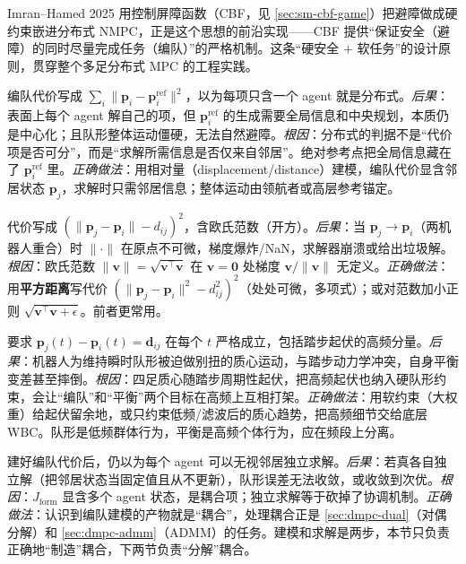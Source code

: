 \noindent Imran--Hamed 2025\cite{imran2025obstacle} 用控制屏障函数（CBF，见 \cref{sec:sm-cbf-game}）把避障做成硬约束嵌进分布式 NMPC，正是这个思想的前沿实现——CBF 提供“保证安全（避障）的同时尽量完成任务（编队）”的严格机制。这条“硬安全 $+$ 软任务”的设计原则，贯穿整个多足分布式 MPC 的工程实践。

\begin{pitfall}
编队代价写成 $\sum_i\|\mathbf{p}_i-\mathbf{p}_i^{\text{ref}}\|^2$，以为每项只含一个 agent 就是分布式。\emph{后果}：表面上每个 agent 解自己的项，但 $\mathbf{p}_i^{\text{ref}}$ 的生成需要全局信息和中央规划，本质仍是中心化；且队形整体运动僵硬，无法自然避障。\emph{根因}：分布式的判据不是“代价项是否可分”，而是“求解所需信息是否仅来自邻居”。绝对参考点把全局信息藏在了 $\mathbf{p}_i^{\text{ref}}$ 里。\emph{正确做法}：用相对量（displacement/distance）建模，编队代价显含邻居状态 $\mathbf{p}_j$，求解时只需邻居信息；整体运动由领航者或高层参考锚定。
\end{pitfall}

\begin{pitfall}
代价写成 $(\|\mathbf{p}_j-\mathbf{p}_i\|-d_{ij})^2$，含欧氏范数（开方）。\emph{后果}：当 $\mathbf{p}_j\to\mathbf{p}_i$（两机器人重合）时 $\|\cdot\|$ 在原点不可微，梯度爆炸/NaN，求解器崩溃或给出垃圾解。\emph{根因}：欧氏范数 $\|\mathbf{v}\|=\sqrt{\mathbf{v}^\top\mathbf{v}}$ 在 $\mathbf{v}=\mathbf{0}$ 处梯度 $\mathbf{v}/\|\mathbf{v}\|$ 无定义。\emph{正确做法}：用\textbf{平方距离}写代价 $(\|\mathbf{p}_j-\mathbf{p}_i\|^2-d_{ij}^2)^2$（处处可微，多项式）；或对范数加小正则 $\sqrt{\mathbf{v}^\top\mathbf{v}+\epsilon}$。前者更常用。
\end{pitfall}

\begin{pitfall}
要求 $\mathbf{p}_j(t)-\mathbf{p}_i(t)=\mathbf{d}_{ij}$ 在每个 $t$ 严格成立，包括踏步起伏的高频分量。\emph{后果}：机器人为维持瞬时队形被迫做别扭的质心运动，与踏步动力学冲突，自身平衡变差甚至摔倒。\emph{根因}：四足质心随踏步周期性起伏，把高频起伏也纳入硬队形约束，会让“编队”和“平衡”两个目标在高频上互相打架。\emph{正确做法}：用软约束（大权重）给起伏留余地，或只约束低频/滤波后的质心趋势，把高频细节交给底层 WBC。队形是低频群体行为，平衡是高频个体行为，应在频段上分离。
\end{pitfall}

\begin{pitfall}
建好编队代价后，仍以为每个 agent 可以无视邻居独立求解。\emph{后果}：若真各自独立解（把邻居状态当固定值且从不更新），队形误差无法收敛，或收敛到次优。\emph{根因}：$J_{\text{form}}$ 显含多个 agent 状态，是耦合项；独立求解等于砍掉了协调机制。\emph{正确做法}：认识到编队建模的产物就是“耦合”，处理耦合正是 \cref{sec:dmpc-dual}（对偶分解）和 \cref{sec:dmpc-admm}（ADMM）的任务。建模和求解是两步，本节只负责正确地“制造”耦合，下两节负责“分解”耦合。
\end{pitfall}

